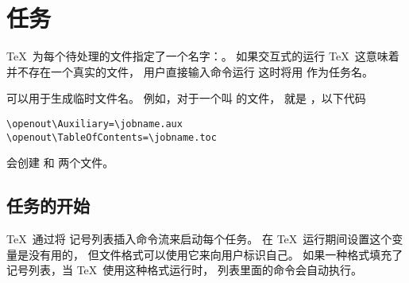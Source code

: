 \documentclass{book}
\begin{document}
\section{任务}

\TeX\ 为每个待处理的文件指定了一个名字：。
如果交互式的运行 \TeX\ 
\ldash 这意味着并不存在一个真实的文件，
用户直接输入命令运行 \rdash 
这时将用  作为任务名。

 可以用于生成临时文件名。
例如，对于一个叫  的文件，
\cs{jobname} 就是 ，以下代码
\begin{verbatim}
\openout\Auxiliary=\jobname.aux
\openout\TableOfContents=\jobname.toc
\end{verbatim}
会创建  和  两个文件。

\subsection{任务的开始}

\TeX\ 通过将  记号列表插入命令流来启动每个任务。
在 \TeX\ 运行期间设置这个变量是没有用的，
但文件格式可以使用它来向用户标识自己。
如果一种格式填充了记号列表，当 \TeX\ 使用这种格式运行时，
列表里面的命令会自动执行。
\end{document}
